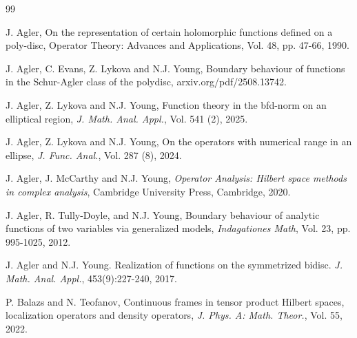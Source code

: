 \documentclass[10pt, reqno]{amsart}
\theoremstyle{definition}
\numberwithin{equation}{section}
\begin{document}

\begin{thebibliography}{99}




 J. Agler, On the representation of certain holomorphic functions defined on a poly-disc, Operator Theory: Advances and Applications, Vol. 48, pp. 47-66, 1990.

 J. Agler, C. Evans, Z. Lykova and N.J. Young, Boundary behaviour of functions in the Schur-Agler class of the polydisc, arxiv.org/pdf/2508.13742.

 J. Agler, Z. Lykova and N.J. Young, Function theory in the bfd-norm on an elliptical region, {\it{J. Math. Anal. Appl.}}, Vol. 541 (2), 2025.

 J. Agler, Z. Lykova and N.J. Young, On the operators with numerical range in an ellipse, {\it{J. Func. Anal.}}, Vol. 287 (8), 2024.

 J. Agler, J. McCarthy and N.J. Young, {\it{Operator Analysis: Hilbert space methods in complex analysis}}, Cambridge University Press, Cambridge, 2020. 

 J. Agler, R. Tully-Doyle, and N.J. Young, Boundary behaviour of analytic functions of two variables via generalized models, {\it{Indagationes Math}}, Vol. 23, pp. 995-1025, 2012.

 J. Agler and N.J. Young. Realization of functions on the symmetrized bidisc. {\it{J. Math. Anal. Appl.}}, 453(9):227-240, 2017.

 P. Balazs and N. Teofanov, Continuous frames in tensor product Hilbert spaces, localization operators and density operators, {\it{J. Phys. A: Math. Theor.}}, Vol. 55, 2022.


\end{thebibliography}
\end{document}
